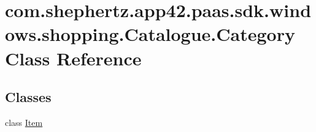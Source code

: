 \hypertarget{classcom_1_1shephertz_1_1app42_1_1paas_1_1sdk_1_1windows_1_1shopping_1_1_catalogue_1_1_category}{\section{com.\+shephertz.\+app42.\+paas.\+sdk.\+windows.\+shopping.\+Catalogue.\+Category Class Reference}
\label{classcom_1_1shephertz_1_1app42_1_1paas_1_1sdk_1_1windows_1_1shopping_1_1_catalogue_1_1_category}
}
\subsection*{Classes}
\begin{DoxyCompactItemize}
\item 
class \hyperlink{classcom_1_1shephertz_1_1app42_1_1paas_1_1sdk_1_1windows_1_1shopping_1_1_catalogue_1_1_category_1_1_item}{Item}
\end{DoxyCompactItemize}
